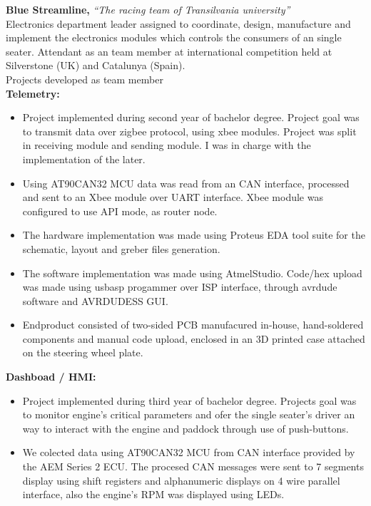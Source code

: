 \documentclass{resume}
\begin{document}
\begin{resume}
    {\bf Blue Streamline,} {\it ``The racing team of Transilvania university''}\\
    Electronics department leader assigned to coordinate, design, manufacture and implement the electronics modules
    which controls the consumers of an single seater. Attendant as an team member at international competition held at 
    Silverstone (UK) and Catalunya (Spain).\\
    Projects developed as team member\\
    {\bf Telemetry: }
    \begin{itemize}
        \item Project implemented during second year of bachelor degree.
        Project goal was to transmit data over zigbee protocol, using xbee modules.
        Project was split in receiving module and sending module. I was in charge with the implementation
        of the later.
        \item Using AT90CAN32 MCU data was read from an CAN interface, processed and
        sent to an Xbee module over UART interface. Xbee module was configured to use API mode, as router node.
        \item The hardware implementation was made using Proteus EDA tool suite for the schematic, layout
        and greber files generation.
        \item The software implementation was made using AtmelStudio.
        Code/hex upload was made using usbasp progammer over ISP interface, through avrdude software
        and AVRDUDESS GUI.
        \item Endproduct consisted of two-sided PCB manufacured in-house, hand-soldered components 
        and manual code upload, enclosed in an 3D printed case attached on the steering wheel plate.
    \end{itemize}
    {\bf Dashboad / HMI: }
    \begin{itemize}
        \item Project implemented during third year of bachelor degree.
        Projects goal was to monitor engine's critical parameters and ofer the single seater's driver
        an way to interact with the engine and paddock through use of push-buttons. 
        \item We colected data using AT90CAN32 MCU from CAN interface provided by the 
        AEM Series 2 ECU. The procesed CAN messages were sent to 7 segments display using shift registers 
        and alphanumeric displays on 4 wire parallel interface, also the engine's RPM was displayed using LEDs.

\end{itemize}
\end{resume}
\end{document}
